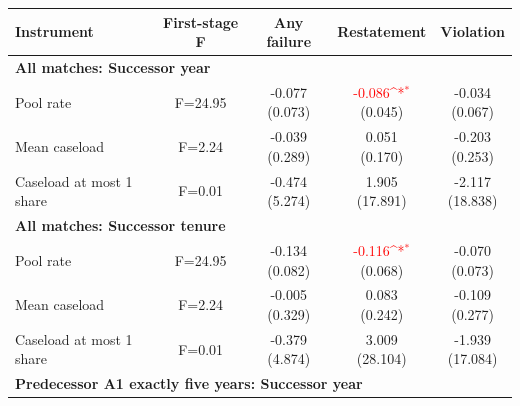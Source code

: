 \documentclass[10pt]{article}
\newcommand{\sym}[1]{\textsuperscript{#1}}
\begin{document}
\begin{minipage}{19cm}\fontsize{10}{12}\selectfont\setlength{\tabcolsep}{4pt}\renewcommand{\arraystretch}{1.12}


\def\sym#1{\ifmmode^{#1}\else\(^{#1}\)\fi}
\centering
{}
\begin{threeparttable}
\begin{tabular}{p{}cccc}
\toprule
Instrument & First-stage F & Any failure & Restatement & Violation \\
\midrule
\multicolumn{5}{l}{\textbf{All matches: Successor year}} \\
Pool rate & F=24.95 & \shortstack{-0.077\\(0.073)} & \shortstack{\textcolor{red}{-0.086\sym{*}}\\(0.045)} & \shortstack{-0.034\\(0.067)} \\
Mean caseload & F=2.24 & \shortstack{-0.039\\(0.289)} & \shortstack{0.051\\(0.170)} & \shortstack{-0.203\\(0.253)} \\
Caseload at most 1 share & F=0.01 & \shortstack{-0.474\\(5.274)} & \shortstack{1.905\\(17.891)} & \shortstack{-2.117\\(18.838)} \\
\multicolumn{5}{l}{\textbf{All matches: Successor tenure}} \\
Pool rate & F=24.95 & \shortstack{-0.134\\(0.082)} & \shortstack{\textcolor{red}{-0.116\sym{*}}\\(0.068)} & \shortstack{-0.070\\(0.073)} \\
Mean caseload & F=2.24 & \shortstack{-0.005\\(0.329)} & \shortstack{0.083\\(0.242)} & \shortstack{-0.109\\(0.277)} \\
Caseload at most 1 share & F=0.01 & \shortstack{-0.379\\(4.874)} & \shortstack{3.009\\(28.104)} & \shortstack{-1.939\\(17.084)} \\
\multicolumn{5}{l}{\textbf{Predecessor A1 exactly five years: Successor year}} \\

\end{tabular}
\end{threeparttable}
\end{minipage}
\end{document}
